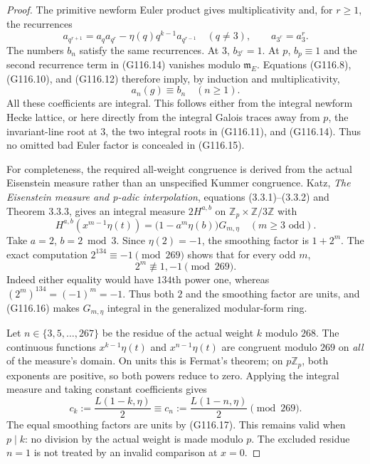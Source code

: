 \begin{proof}
The primitive newform Euler product gives multiplicativity and,
for \(r\ge1\), the recurrences
\[
 a_{q^{r+1}}=a_q a_{q^r}-\eta(q)q^{k-1}a_{q^{r-1}}
          \quad(q\ne3),\qquad
 a_{3^r}=a_3^r.
 \tag{G116.14}
\]
The numbers \(b_n\) satisfy the same recurrences.
At \(3\), \(b_{3^r}=1\).  At \(p\), \(b_p\equiv1\)
and the second recurrence term in (G116.14) vanishes modulo
\(\mathfrak m_E\).  Equations (G116.8), (G116.10), and
(G116.12) therefore imply, by induction and multiplicativity,
\[
                              a_n(g)\equiv b_n
                                  \quad(n\ge1).
 \tag{G116.15}
\]
All these coefficients are integral.  This follows either from
the integral newform Hecke lattice, or here directly from the
integral Galois traces away from \(p\), the invariant-line
root at \(3\), the two integral roots in (G116.11), and
(G116.14).  Thus no omitted bad Euler factor is concealed in
(G116.15).

For completeness, the required all-weight congruence is derived
from the actual Eisenstein measure rather than an unspecified
Kummer congruence.  Katz, \emph{The Eisenstein measure and p-adic
interpolation}, equations (3.3.1)--(3.3.2) and Theorem 3.3.3,
gives an integral measure \(2H^{a,b}\) on
\(\mathbb Z_p\times\mathbb Z/3\mathbb Z\) with
\[
 H^{a,b}(x^{m-1}\eta(t))
       =\bigl(1-a^m\eta(b)\bigr)G_{m,\eta}
                  \quad(m\ge3\text{ odd}).
 \tag{G116.16}
\]
Take \(a=2\), \(b=2\bmod3\).  Since \(\eta(2)=-1\),
the smoothing factor is \(1+2^m\).
The exact computation \(2^{134}\equiv-1\pmod{269}\)
shows that for every odd \(m\),
\[
             2^m\not\equiv1,-1\pmod{269}.
 \tag{G116.17}
\]
Indeed either equality would have \(134\)th power one, whereas
\((2^m)^{134}=(-1)^m=-1\).  Thus both \(2\) and the smoothing
factor are units, and (G116.16) makes \(G_{m,\eta}\) integral
in the generalized modular-form ring.

Let \(n\in\{3,5,\ldots,267\}\) be the residue of the actual
weight \(k\) modulo \(268\).  The continuous functions
\(x^{k-1}\eta(t)\) and \(x^{n-1}\eta(t)\) are congruent
modulo \(269\) on \emph{all} of the measure's domain.  On units
this is Fermat's theorem; on \(p\mathbb Z_p\), both exponents
are positive, so both powers reduce to zero.  Applying the
integral measure and taking constant coefficients gives
\[
                 c_k:=\frac{L(1-k,\eta)}2
                         \equiv c_n:=\frac{L(1-n,\eta)}2
                                        \pmod{269}.
 \tag{G116.18}
\]
The equal smoothing factors are units by (G116.17).
This remains valid when \(p\mid k\): no division by the actual
weight is made modulo \(p\).  The excluded residue \(n=1\)
is not treated by an invalid comparison at \(x=0\).


\end{proof}
